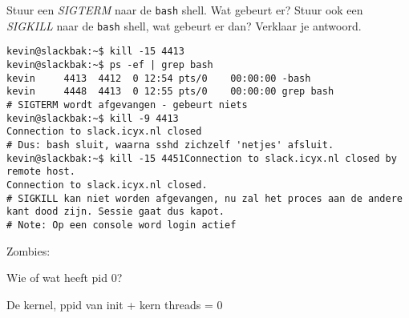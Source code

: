 \question[15] Stuur een \emph{SIGTERM} naar de \texttt{bash} shell. Wat gebeurt er? Stuur ook een \emph{SIGKILL} naar de \texttt{bash} shell, wat gebeurt er dan? Verklaar je antwoord.
\begin{solution}
\begin{lstlisting}
kevin@slackbak:~$ kill -15 4413
kevin@slackbak:~$ ps -ef | grep bash
kevin     4413  4412  0 12:54 pts/0    00:00:00 -bash
kevin     4448  4413  0 12:55 pts/0    00:00:00 grep bash
# SIGTERM wordt afgevangen - gebeurt niets
kevin@slackbak:~$ kill -9 4413
Connection to slack.icyx.nl closed
# Dus: bash sluit, waarna sshd zichzelf 'netjes' afsluit.
kevin@slackbak:~$ kill -15 4451Connection to slack.icyx.nl closed by remote host.
Connection to slack.icyx.nl closed.
# SIGKILL kan niet worden afgevangen, nu zal het proces aan de andere kant dood zijn. Sessie gaat dus kapot.
# Note: Op een console word login actief
\end{lstlisting}
\end{solution}

\question[0] Zombies:

\question[10] Wie of wat heeft pid 0?
\begin{solution}
De kernel, ppid van init + kern threads = 0
\end{solution}

